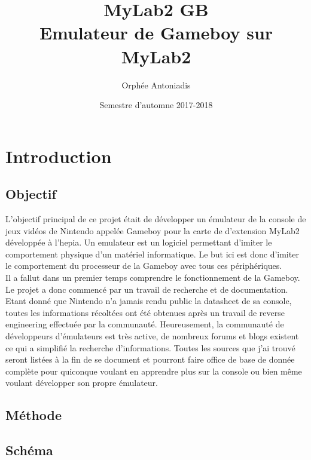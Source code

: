\documentclass[a4paper]{article}
\title{MyLab2 GB \protect\\ Emulateur de Gameboy sur MyLab2}
\author{Orphée Antoniadis}
\affil{\small Projet de semestre - Prof. Fabien Vannel}
\affil{\small Hepia ITI 3\up{ème} année}
\date{Semestre d'automne 2017-2018}
\begin{document}
\maketitle

\newpage
\setcounter{tocdepth}{4}
\tableofcontents
\newpage


\section{Introduction}
\subsection{Objectif}
L'objectif principal de ce projet était de développer un émulateur de la console
de jeux vidéos de Nintendo appelée Gameboy pour la carte de d'extension MyLab2
développée à l'hepia. Un emulateur est un logiciel permettant d'imiter le comportement
physique d'un matériel informatique. Le but ici est donc d'imiter le comportement
du processeur de la Gameboy avec tous ces périphériques. \\

Il a fallut dans un premier temps comprendre le fonctionnement de la Gameboy. 
Le projet a donc commencé par un travail de recherche et de documentation. Etant 
donné que Nintendo n'a jamais rendu public la datasheet de sa console, toutes les 
informations récoltées ont été obtenues après un travail de reverse engineering 
effectuée par la communauté. Heureusement, la communauté de développeurs d'émulateurs 
est très active, de nombreux forums et blogs existent ce qui a simplifié la recherche
d'informations. Toutes les sources que j'ai trouvé seront listées à la fin de se 
document et pourront faire office de base de donnée complète pour quiconque voulant 
en apprendre plus sur la console ou bien même voulant développer son propre émulateur.


\subsection{Méthode}


\subsection{Schéma}
\end{document}
